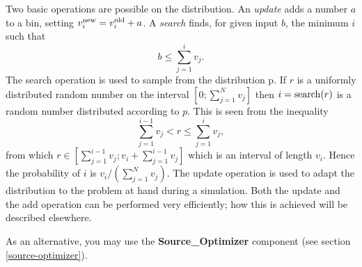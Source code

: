 Two basic operations are possible on the distribution. An \emph{update}
adds a number $a$ to a bin, setting $v_i^{\rm new} = v_i^{\rm old} +
a$. A \emph{search} finds, for given input $b$, the minimum $i$ such
that
\begin{equation}
 b \leq \sum_{j=1}^{i} v_j.
\end{equation}
The search operation is used to sample from the distribution p. If $r$
is a uniformly distributed random number on the interval
$[0;\sum_{j=1}^N v_j]$ then $i = {\rm search}(r)$ is a random number
distributed according to $p$. This is seen from the inequality
\begin{equation}
\sum_{j=1}^{i-1} v_j < r \leq \sum_{j=1}^{i} v_j,
\end{equation}
from which $r \in [\sum_{j=1}^{i-1} v_j; v_i + \sum_{j=1}^{i-1} v_j]$
which is an interval of length $v_i$. Hence the probability of $i$ is
$v_i/(\sum_{j=1}^N v_j)$.
The update operation is used to
adapt the distribution to the problem at hand during a simulation. Both
the update and the add operation can be performed very efficiently; how
this is achieved will be described elsewhere.

As an alternative, you may use the {\bf Source\_Optimizer} component
(see section \ref{source-optimizer}).
